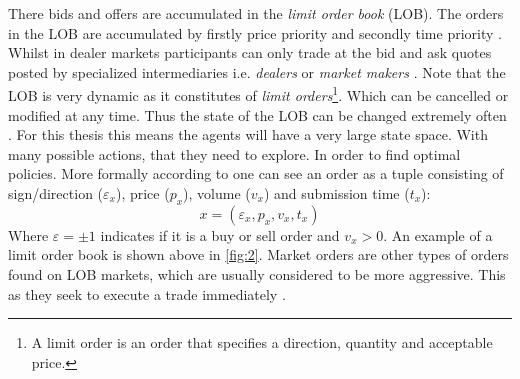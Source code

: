 \documentclass{kththesis}
\theoremstyle{definition}
\begin{document}
There bids and offers are accumulated in the \textit{limit order book} (LOB). The orders in the LOB are accumulated by firstly price priority and secondly time priority \parencite{hasbrouck2007empirical}. Whilst in dealer markets participants can only trade at the bid and ask quotes posted by specialized intermediaries i.e. \textit{dealers} or \textit{market makers} \parencite{foucault2013market}. Note that the LOB is very dynamic as it constitutes of \textit{limit orders}\footnote{A limit order is an order that specifies a direction, quantity and acceptable price.}. Which can be cancelled or modified at any time. Thus the state of the LOB can be changed extremely often \parencite{hasbrouck2007empirical}. For this thesis this means the agents will have a very large state space. With many possible actions, that they need to explore. In order to find optimal policies.
\newline
\newline
More formally according to \textcite{bouchaud2018trades} one can see an order as a tuple consisting of sign/direction ($\varepsilon_{x}$), price ($p_{x}$), volume ($v_{x}$) and submission time ($t_{x}$):
\begin{equation}
    \label{eq:0}
    x = (\varepsilon_{x}, p_{x}, v_{x}, t_{x})
\end{equation} Where $\varepsilon = \pm 1$ indicates if it is a buy or sell order and $v_{x} > 0$. An example of a limit order book is shown above in \autoref{fig:2}. Market orders are other types of orders found on LOB markets, which are usually considered to be more aggressive. This as they seek to execute a trade immediately \parencite{cartea2015algorithmic}. 
\end{document}
